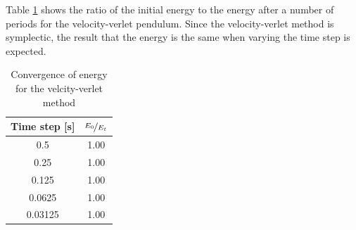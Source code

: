 \documentclass[12pt, letterpaper]{article}
\begin{document}
Table \ref{tab:pend} shows the ratio of the initial energy to the energy after a
number of periods for the velocity-verlet pendulum. Since the velocity-verlet
method is symplectic, the result that the energy is the same when varying the
time step is expected.

\begin{table}[h]
  \centering
  \caption{Convergence of energy for the velcity-verlet method}
  \label{tab:pend}
  \begin{tabular}{c c}
    \hline\hline
    Time step [s] & \(\nicefrac{E_0}{E_t}\) \\
    \hline
    0.5     & 1.00 \\
    0.25    & 1.00 \\
    0.125   & 1.00 \\
    0.0625  & 1.00 \\
    0.03125 & 1.00 \\
    \hline\hline
  \end{tabular}
\end{table}
\end{document}
